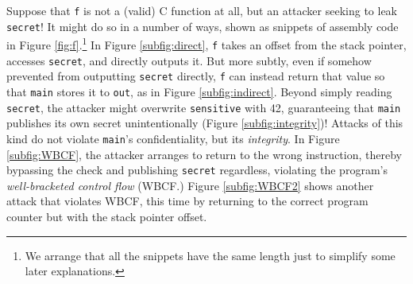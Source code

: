 \documentclass[10pt,conference]{ieeetran}%
\theoremstyle{definition}
\begin{document}
Suppose that {\tt f} is not a (valid) C function at all, but an attacker seeking
to leak {\tt secret}! It might do so in a number of ways, shown as snippets of
assembly code in Figure \ref{fig:f}.\footnote{We arrange that all the snippets
have the same length just to simplify some later explanations.}
%
In Figure \ref{subfig:direct}, {\tt f} takes an offset from the stack
pointer, accesses {\tt secret}, and directly outputs it. But more
subtly, even if somehow prevented from outputting {\tt secret} directly, {\tt f}
can instead return that value so that {\tt main} stores it to {\tt out},
as in Figure \ref{subfig:indirect}.
%
Beyond simply reading {\tt secret}, the attacker might overwrite {\tt sensitive}
with 42, guaranteeing that {\tt main} publishes its own secret unintentionally
(Figure \ref{subfig:integrity})!
Attacks of this kind do not violate {\tt main}'s confidentiality, but its
{\it integrity}.
In Figure \ref{subfig:WBCF}, the attacker arranges to return to the
wrong instruction, thereby bypassing the check and publishing {\tt secret} regardless,
violating the program's {\it well-bracketed control flow} (WBCF.) Figure \ref{subfig:WBCF2}
shows another attack that violates WBCF, this time by returning to the correct
program counter but with the stack pointer offset.
\end{document}
